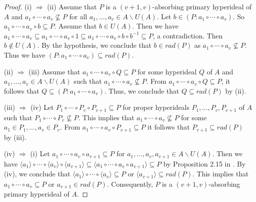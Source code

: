 \documentclass[preprint,review,10pt]{amsart}
\theoremstyle{definition}
\theoremstyle{remark}
\numberwithin{equation}{section}
\begin{document}
\begin{proof}
(i) $\Longrightarrow$ (ii) Assume that $P$ is a $(v+1,v)$-absorbing primary hyperideal of $A$ and $a_1 \circ \cdots \circ a_v \nsubseteq P$ for all $a_1, \ldots,a_v \in A \backslash U(A)$. Let $b \in (P : a_1 \circ \cdots \circ a_v)$.  So $a_1 \circ \cdots \circ a_v \circ b \subseteq P$. Assume that $b \in U(A)$. Then we have $a_1 \circ \cdots \circ a_v \subseteq a_1 \circ \cdots \circ a_v \circ 1 \subseteq a_1 \circ \cdots \circ a_v \circ b \circ b^{-1} \subseteq P$, a contradiction. Then $b \notin U(A)$. By the hypothesis, we conclude that $b \in rad(P)$ as $a_1 \circ \cdots \circ a_v \nsubseteq P$. Thus we have $(P : a_1 \circ \cdots \circ a_v) \subseteq rad(P)$.

(ii) $\Longrightarrow$ (iii) Assume that $a_1 \circ \cdots \circ a_v \circ Q \subseteq P$ for some hyperideal $Q$ of $A$ and  $a_1, \ldots,a_v \in A \backslash U(A)$  such that $a_1 \circ \cdots \circ a_v \nsubseteq P$. From $a_1 \circ \cdots \circ a_v \circ Q \subseteq P$, it follows that $Q \subseteq (P : a_1 \circ \cdots \circ a_v)$. Thus,  we conclude that $Q \subseteq rad(P)$ by (ii). 

(iii) $\Longrightarrow$ (iv) Let $P_1 \circ \cdots \circ P_v \circ P_{v+1} \subseteq P$ for proper hyperideals  $P_1, \ldots,P_v, P_{v+1}$ of $A$ such that $P_1 \circ \cdots \circ P_v \nsubseteq P$. This implies that $a_1\circ \cdots \circ a_v \nsubseteq P$ for some $a_1 \in P_1, \ldots, a_v \in P_v$. From $a_1\circ \cdots \circ a_v \circ P_{v+1} \subseteq P$ it follows that $P_{v+1} \subseteq rad(P)$ by (iii). 

(iv) $\Longrightarrow$ (i) Let $a_1 \circ \cdots \circ a_v \circ a_{v+1} \subseteq P$ for $a_1,\dots, a_v, a_{v+1} \in A \backslash U(A)$. Then we have  $\langle a_1 \rangle \circ \cdots \circ \langle a_v \rangle \circ \langle a_{v+1} \rangle \subseteq \langle a_1 \circ \cdots \circ a_v \circ a_{v+1} \rangle \subseteq P$ by Proposition 2.15 in \cite{das}. By (iv), we conclude that $\langle a_1 \rangle \circ \cdots \circ \langle a_v \rangle \subseteq P$ or $\langle a_{v+1} \rangle \subseteq  rad(P)$. This implies that $a_1 \circ \cdots \circ a_v \subseteq P$ or $a_{v+1} \in rad(P)$. Consequently, $P$ is a $(v+1,v)$-absorbing primary hyperideal of $A$. 
\end{proof}
\end{document}
